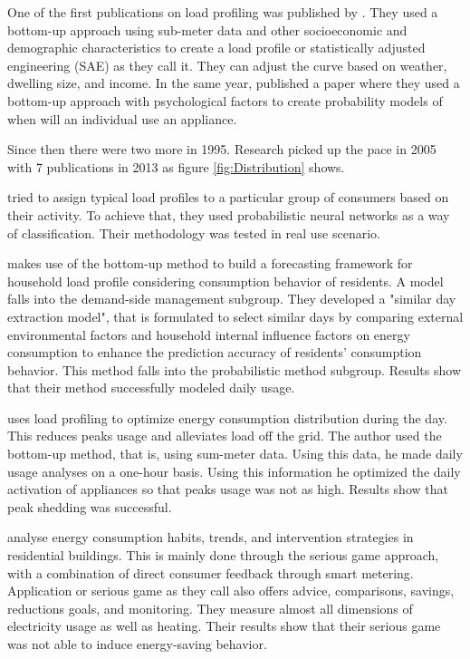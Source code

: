 \documentclass[
11pt, %
english, %
singlespacing, %
headsepline, %
]{MastersDoctoralThesis} %
\begin{document}
One of the first publications on load profiling was published by \cite{TRAIN19851103}.
They used a bottom-up approach using sub-meter data and other socioeconomic and demographic characteristics 
to create a load profile or statistically adjusted engineering (SAE) as they call it.
They can adjust the curve based on weather, dwelling size, and income. 
In the same year, \cite{WALKER1985} published a paper where they used a bottom-up approach with psychological factors to create probability models of when will an individual use an appliance.

Since then there were two more in 1995. Research picked up the pace in 2005 with 7 publications in 2013 as figure \ref{fig:Distribution} shows.

\cite{GERBEC2005} tried to assign typical load profiles to a particular group of consumers based on their activity. 
To achieve that, they used probabilistic neural networks as a way of classification. Their methodology was tested in real use scenario. 

\cite{Gao2018} makes use of the bottom-up method to build a forecasting framework for household
load profile considering consumption behavior of residents. 
A model falls into the demand-side management subgroup.
They developed a "similar day extraction model",
that is formulated to select similar days by comparing external environmental factors and household internal 
influence factors on energy consumption to enhance the prediction accuracy of residents' consumption behavior.
This method falls into the probabilistic method subgroup. Results show that their method successfully modeled daily usage.

\cite{Chuan2014} uses load profiling to optimize energy consumption distribution during the day.
This reduces peaks usage and alleviates load off the grid. The author used the bottom-up method, that is, using sum-meter data.
Using this data, he made daily usage analyses on a one-hour basis. Using this information he optimized the daily activation of appliances
so that peaks usage was not as high. Results show that peak shedding was successful. 

\cite{Csoknyai2019} analyse energy consumption habits, trends, and intervention strategies in residential buildings.
This is mainly done through the serious game approach, with a combination of direct consumer feedback through smart metering.
Application or serious game as they call also offers advice, comparisons, savings, reductions goals, and monitoring.
They measure almost all dimensions of electricity usage as well as heating. Their results show that their serious game was
not able to induce energy-saving behavior.
\end{document}

